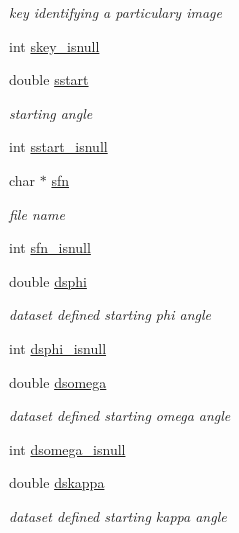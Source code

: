 \begin{DoxyCompactItemize}
\begin{DoxyCompactList}\small\item\em key identifying a particulary image \end{DoxyCompactList}\item 
int \hyperlink{structlspg__nextshot__struct_abd3c69357470052eb79ddd8eddd57b2c}{skey\-\_\-isnull}
\item 
double \hyperlink{structlspg__nextshot__struct_a8dc11eaa094d59f61642c4abc226918f}{sstart}
\begin{DoxyCompactList}\small\item\em starting angle \end{DoxyCompactList}\item 
int \hyperlink{structlspg__nextshot__struct_aa53094de91e2f69d7174ab119df1cdac}{sstart\-\_\-isnull}
\item 
char $\ast$ \hyperlink{structlspg__nextshot__struct_a03252bba597b081edc9d08b20b558cc7}{sfn}
\begin{DoxyCompactList}\small\item\em file name \end{DoxyCompactList}\item 
int \hyperlink{structlspg__nextshot__struct_a56f32eb413b1fca9f085874eb86294de}{sfn\-\_\-isnull}
\item 
double \hyperlink{structlspg__nextshot__struct_a64ebde597ca97a3b98145dc2d580c64f}{dsphi}
\begin{DoxyCompactList}\small\item\em dataset defined starting phi angle \end{DoxyCompactList}\item 
int \hyperlink{structlspg__nextshot__struct_a2d1f51cb1bb575a214344773136be878}{dsphi\-\_\-isnull}
\item 
double \hyperlink{structlspg__nextshot__struct_a4be525bb32fb0232c21a91529f1e8c73}{dsomega}
\begin{DoxyCompactList}\small\item\em dataset defined starting omega angle \end{DoxyCompactList}\item 
int \hyperlink{structlspg__nextshot__struct_ad1da3548dc642d415aed53dc165c44fc}{dsomega\-\_\-isnull}
\item 
double \hyperlink{structlspg__nextshot__struct_a59355281e8eb935cd7bfac597fdc5289}{dskappa}
\begin{DoxyCompactList}\small\item\em dataset defined starting kappa angle \end{DoxyCompactList}\item 

\end{DoxyCompactItemize}
